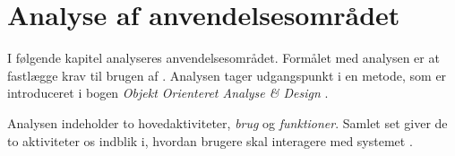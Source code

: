 \chapter{Analyse af anvendelsesområdet}
\label{chap:analyseafao}

I følgende kapitel analyseres anvendelsesområdet. Formålet med analysen er at fastlægge krav til brugen af \Foodl{}. Analysen tager udgangspunkt i en metode, som er introduceret i bogen \emph{Objekt Orienteret Analyse \& Design} \cite[s. ~113]{ooad}. 

Analysen indeholder to hovedaktiviteter, \textit{brug} og \textit{funktioner}. Samlet set giver de to aktiviteter os indblik i, hvordan brugere skal interagere med systemet %
\cite[s. ~115]{ooad}. 




